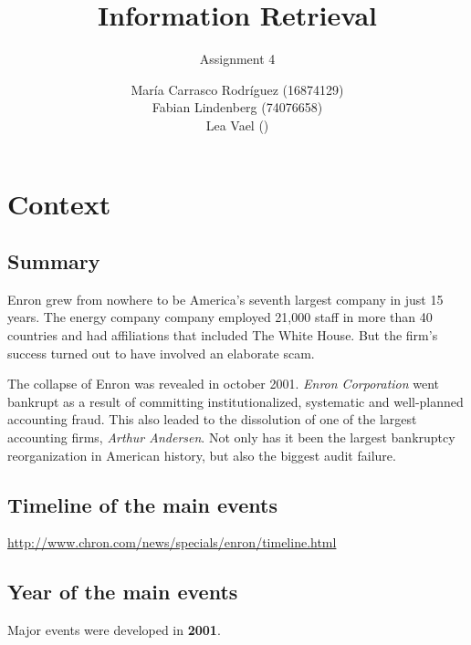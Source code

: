\documentclass[a4paper,11pt,oneside]{book}
\title{Information Retrieval }
\subtitle{Assignment 4}
\author{ María Carrasco Rodríguez (16874129) \\
		Fabian Lindenberg (74076658)\\
		Lea Vael ()}
\begin{document}
\kostspieligmaketitle


\chapter{Context}
\section{Summary}
Enron grew from nowhere to be America's seventh largest company in just 15 years. The energy company company employed 21,000 staff in more than 40 countries and had affiliations that included The White House. But the firm's success turned out to have involved an elaborate scam. 

The collapse of Enron was revealed in october 2001. {\it Enron Corporation} went bankrupt as a result of committing institutionalized, systematic and well-planned accounting fraud. This also leaded to the dissolution of one of the largest accounting firms, {\it Arthur Andersen}. Not only has it been the largest bankruptcy reorganization in American history, but also the biggest audit failure.


\section{Timeline of the main events}
\url{http://www.chron.com/news/specials/enron/timeline.html}

\section{Year of the main events}
Major events were developed in {\bf2001}.
\end{document}

